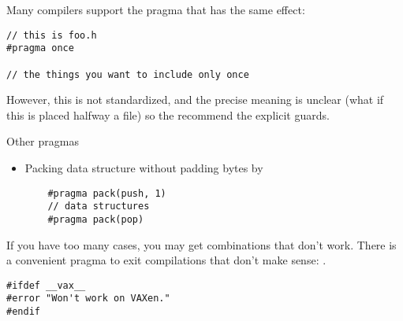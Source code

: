 Many compilers support the pragma
that has the same effect:
\begin{lstlisting}
// this is foo.h
#pragma once

// the things you want to include only once
\end{lstlisting}
However, this is not standardized, and the precise meaning is unclear
(what if this is placed halfway a file)
so the  recommend the explicit guards.

 {Other pragmas}

\begin{itemize}
\item Packing data structure without padding bytes by 
  \begin{lstlisting}
    #pragma pack(push, 1)
    // data structures
    #pragma pack(pop)
  \end{lstlisting}
\end{itemize}

If you have too many  cases, you may
get combinations that don't work.
There is a convenient pragma to exit compilations that don't make sense:
.
\begin{verbatim}
#ifdef __vax__
#error "Won't work on VAXen."
#endif
\end{verbatim}
